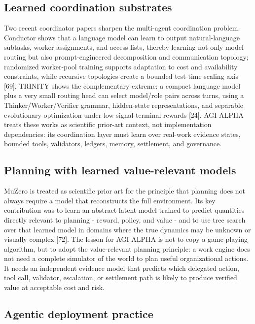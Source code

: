 \subsection{Learned coordination
substrates}\label{learned-coordination-substrates}

Two recent coordinator papers sharpen the multi-agent coordination
problem. Conductor shows that a language model can learn to output
natural-language subtasks, worker assignments, and access lists, thereby
learning not only model routing but also prompt-engineered decomposition
and communication topology; randomized worker-pool training supports
adaptation to cost and availability constraints, while recursive
topologies create a bounded test-time scaling axis {[}69{]}. TRINITY
shows the complementary extreme: a compact language model plus a very
small routing head can select model/role pairs across turns, using a
Thinker/Worker/Verifier grammar, hidden-state representations, and
separable evolutionary optimization under low-signal terminal rewards
{[}24{]}. AGI ALPHA treats these works as scientific prior-art context,
not implementation dependencies: its coordination layer must learn over
real-work evidence states, bounded tools, validators, ledgers, memory,
settlement, and governance.

\subsection{Planning with learned value-relevant
models}\label{planning-with-learned-value-relevant-models}

MuZero is treated as scientific prior art for the principle that
planning does not always require a model that reconstructs the full
environment. Its key contribution was to learn an abstract latent model
trained to predict quantities directly relevant to planning - reward,
policy, and value - and to use tree search over that learned model in
domains where the true dynamics may be unknown or visually complex
{[}72{]}. The lesson for AGI ALPHA is not to copy a game-playing
algorithm, but to adopt the value-relevant planning principle: a work
engine does not need a complete simulator of the world to plan useful
organizational actions. It needs an independent evidence model that
predicts which delegated action, tool call, validator, escalation, or
settlement path is likely to produce verified value at acceptable cost
and risk.

\subsection{Agentic deployment
practice}\label{agentic-deployment-practice}

